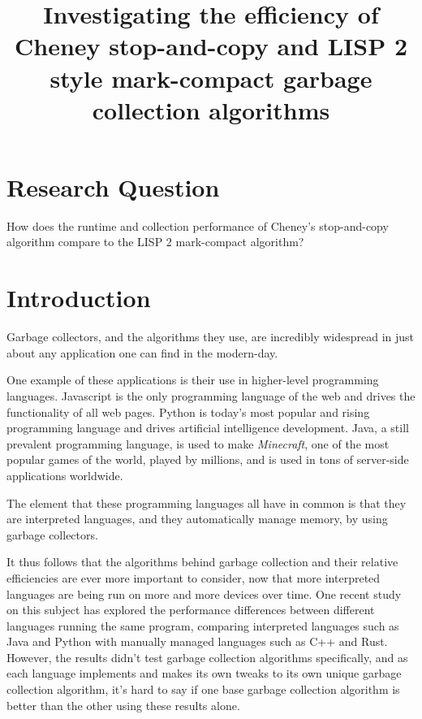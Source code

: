 \documentclass[index]{subfiles}
\begin{document}
\title{Investigating the efficiency of Cheney stop-and-copy and LISP 2 style mark-compact garbage collection algorithms}
\date{}
\author{}
\maketitle

\section{Research Question}

How does the runtime and collection performance of Cheney's stop-and-copy algorithm compare to the LISP 2 mark-compact algorithm?

\section{Introduction}

Garbage collectors, and the algorithms they use, are incredibly widespread in just about any application one can find in the modern-day.

One example of these applications is their use in higher-level programming languages. Javascript is the only programming language of the web and drives the functionality of all web pages. Python is today's most popular and rising programming language and drives artificial intelligence development. Java, a still prevalent programming language, is used to make \textit{Minecraft}, one of the most popular games of the world, played by millions, and is used in tons of server-side applications worldwide.

The element that these programming languages all have in common is that they are interpreted languages, and they automatically manage memory, by using garbage collectors.

It thus follows that the algorithms behind garbage collection and their relative efficiencies are ever more important to consider, now that more interpreted languages are being run on more and more devices over time. One recent study on this subject has explored the performance differences between different languages running the same program\cite{programming_languages_electricity}, comparing interpreted languages such as Java and Python with manually managed languages such as C++ and Rust. However, the results didn't test garbage collection algorithms specifically, and as each language implements and makes its own tweaks to its own unique garbage collection algorithm, it's hard to say if one base garbage collection algorithm is better than the other using these results alone.
\end{document}
